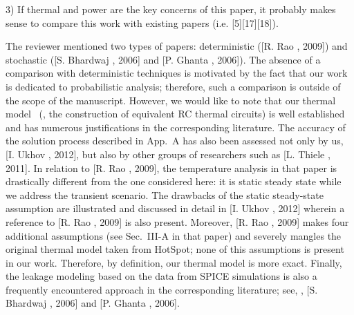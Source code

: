 \begin{reviewer}
3) If thermal and power are the key concerns of this paper, it probably makes sense to compare this work with existing papers (i.e. [5][17][18]).
\end{reviewer}
\begin{authors}
The reviewer mentioned two types of papers: deterministic ([R. Rao \etal, 2009]) and stochastic ([S. Bhardwaj \etal, 2006] and [P. Ghanta \etal, 2006]).
The absence of a comparison with deterministic techniques is motivated by the fact that our work is dedicated to probabilistic analysis; therefore, such a comparison is outside of the scope of the manuscript.
However, we would like to note that our thermal model \perse\ (\ie, the construction of equivalent RC thermal circuits) is well established and has numerous justifications in the corresponding literature.
The accuracy of the solution process described in App.~A has also been assessed not only by us, [I. Ukhov \etal, 2012], but also by other groups of researchers such as [L. Thiele \etal, 2011].
In relation to [R. Rao \etal, 2009], the temperature analysis in that paper is drastically different from the one considered here: it is static steady state while we address the transient scenario.
The drawbacks of the static steady-state assumption are illustrated and discussed in detail in [I. Ukhov \etal, 2012] wherein a reference to [R. Rao \etal, 2009] is also present.
Moreover, [R. Rao \etal, 2009] makes four additional assumptions (see Sec.~III-A in that paper) and severely mangles the original thermal model taken from HotSpot; none of this assumptions is present in our work.
Therefore, by definition, our thermal model is more exact.
Finally, the leakage modeling based on the data from SPICE simulations is also a frequently encountered approach in the corresponding literature; see, \eg, [S. Bhardwaj \etal, 2006] and [P. Ghanta \etal, 2006].


\end{authors}
